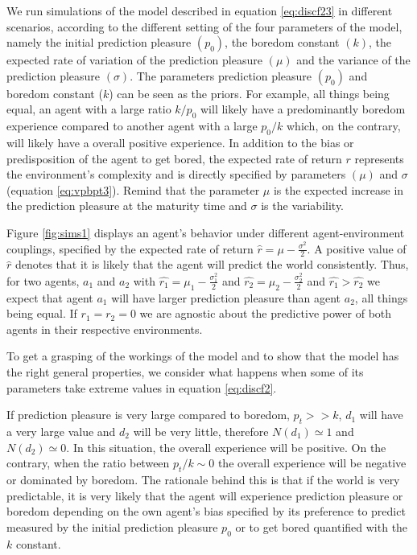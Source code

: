 \documentclass[11pt,twocolumn]{article}
\begin{document}
We run simulations of the model described in equation \ref{eq:discf23} in different scenarios, according to the different setting of the four parameters of the model, namely the initial prediction pleasure $(p_0)$, the boredom constant $(k)$, the expected rate of variation of the prediction pleasure $(\mu)$ and the variance of the prediction pleasure $(\sigma)$. The parameters prediction pleasure $(p_0)$ and boredom constant ($k$) can be seen as the priors. For example, all things being equal, an agent with a large ratio $k/p_0$ will likely have a predominantly boredom experience compared to another agent with a large $p_0/k$ which, on the contrary, will likely have a overall positive experience. In addition to the bias or predisposition of the agent to get bored, the expected rate of return $r$ represents the environment's complexity and is directly specified by parameters $(\mu)$ and $\sigma$ (equation \ref{eq:vpbpt3}). Remind that the parameter $\mu$ is the expected increase in the prediction pleasure at the maturity time and $\sigma$ is the variability.

Figure \ref{fig:sims1} displays an agent's behavior under different agent-environment couplings, specified by the expected rate of return $\hat{r} = \mu - \frac{\sigma ^2}{2} $. A positive value of $\hat{r}$ denotes that it is likely that the agent will predict the world consistently. 
Thus, for two agents, $a_1$ and $a_2$ with $\hat{r_1} = \mu_1 - \frac{\sigma_1 ^2}{2}$ and $\hat{r_2} = \mu_2 - \frac{\sigma_2 ^2}{2}$ and $\hat{r_1} > \hat{r_2}$ we expect that agent $a_1$ will have larger prediction pleasure than agent $a_2$, all things being equal. If $r_1 =r_2 = 0$ we are agnostic about the predictive power of both agents in their respective environments.

To get a grasping of the workings of the model and to show that the model has the right general properties, we consider what happens when some of its parameters take extreme values in equation \ref{eq:discf2}.

If prediction pleasure is very large compared to boredom, $p_t >> k$, $d_1$ will have a very large value and $d_2$ will be very little, therefore $N(d_1) \simeq 1$ and $N(d_2) \simeq 0$. In this situation, the overall experience will be positive. On the contrary, when the ratio between $p_t/k \sim 0$ the overall experience will be negative or dominated by boredom. 
The rationale behind this is that if the world is very predictable, it is very likely that the agent will experience prediction pleasure or boredom depending on the own agent's bias specified by its preference to predict measured by the initial prediction pleasure $p_0$ or to get bored quantified with the $k$ constant.
\end{document}
